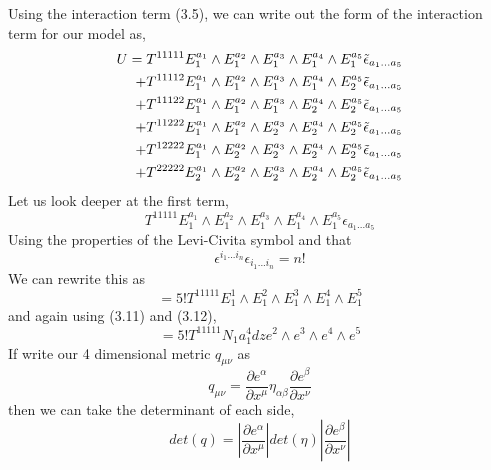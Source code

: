\documentclass[11pt]{report}
\numberwithin{equation}{chapter}
\begin{document}
Using the interaction term (3.5), we can write out the form of the interaction term for our model as,
\begin{align}
    U=T^{11111}E^{a_1}_1\wedge E^{a_2}_1\wedge E^{a_3}_1\wedge E^{a_4}_1\wedge E^{a_5}_1\Tilde{\epsilon}_{a_1...a_5}\\ \nonumber
    +T^{11112}E^{a_1}_1\wedge E^{a_2}_1\wedge E^{a_3}_1\wedge E^{a_4}_1\wedge E^{a_5}_2 \Tilde{\epsilon}_{a_1...a_5}\\ \nonumber
    +T^{11122}E^{a_1}_1\wedge E^{a_2}_1\wedge E^{a_3}_1\wedge E^{a_4}_2\wedge E^{a_5}_2\Tilde{\epsilon}_{a_1...a_5}\\ \nonumber
    +T^{11222}E^{a_1}_1\wedge E^{a_2}_1\wedge E^{a_3}_2\wedge E^{a_4}_2\wedge E^{a_5}_2\Tilde{\epsilon}_{a_1...a_5}\\ \nonumber
    +T^{12222}E^{a_1}_1\wedge E^{a_2}_2\wedge E^{a_3}_2\wedge E^{a_4}_2\wedge E^{a_5}_2\Tilde{\epsilon}_{a_1...a_5}\\ \nonumber
    +T^{22222}E^{a_1}_2\wedge E^{a_2}_2\wedge E^{a_3}_2\wedge E^{a_4}_2\wedge E^{a_5}_2\Tilde{\epsilon}_{a_1...a_5} \nonumber
\end{align}
Let us look deeper at the first term,
\begin{equation}
    T^{11111}E^{a_1}_1\wedge E^{a_2}_1\wedge E^{a_3}_1\wedge E^{a_4}_1\wedge E^{a_5}_1\epsilon_{a_1...a_5}
\end{equation}
Using the properties of the Levi-Civita symbol and that 
\begin{equation}
    \epsilon^{i_1...i_n}\epsilon_{i_1...i_n}=n!
\end{equation}
We can rewrite this as
\begin{equation}
    =5!T^{11111}E^{1}_1\wedge E^{2}_1\wedge E^{3}_1\wedge E^{4}_1\wedge E^{5}_1
\end{equation}
and again using (3.11) and (3.12),
\begin{equation}
    =5!T^{11111}N_1a_1^4dze^{2}\wedge e^{3}\wedge e^{4}\wedge e^{5}
\end{equation}
If write our 4 dimensional metric $q_{\mu\nu}$ as
\begin{equation}
    q_{\mu\nu}=\frac{\partial e^\alpha}{\partial x^\mu}\eta_{\alpha\beta}\frac{\partial e^\beta}{\partial x^\nu}
\end{equation}
then we can take the determinant of each side,
\begin{equation}
     det\left(q\right)=\left|\frac{\partial e^\alpha}{\partial x^\mu}\right|det\left(\eta\right)\left|\frac{\partial e^\beta}{\partial x^\nu}\right|
\end{equation}
\end{document}

